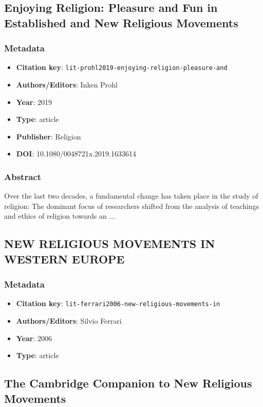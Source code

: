 \subsection{Enjoying Religion: Pleasure and Fun in Established and New Religious Movements}\label{lit:lit-prohl2019-enjoying-religion-pleasure-and}
\subsubsection*{Metadata}
\begin{itemize}
  \item \textbf{Citation key}: \texttt{lit-prohl2019-enjoying-religion-pleasure-and}
  \item \textbf{Authors/Editors}: Inken Prohl
  \item \textbf{Year}: 2019
  \item \textbf{Type}: article
  \item \textbf{Publisher}: Religion
  \item \textbf{DOI}: 10.1080/0048721x.2019.1633614
\end{itemize}
\subsubsection*{Abstract}
Over the last two decades, a fundamental change has taken place in the study of religion: The dominant focus of researchers shifted from the analysis of teachings and ethics of religion towards an ...

\subsection{NEW RELIGIOUS MOVEMENTS IN WESTERN EUROPE}\label{lit:lit-ferrari2006-new-religious-movements-in}
\subsubsection*{Metadata}
\begin{itemize}
  \item \textbf{Citation key}: \texttt{lit-ferrari2006-new-religious-movements-in}
  \item \textbf{Authors/Editors}: Silvio Ferrari
  \item \textbf{Year}: 2006
  \item \textbf{Type}: article
\end{itemize}

\subsection{The Cambridge Companion to New Religious Movements}\label{lit:lit-geall2013-the-cambridge-companion-to}
